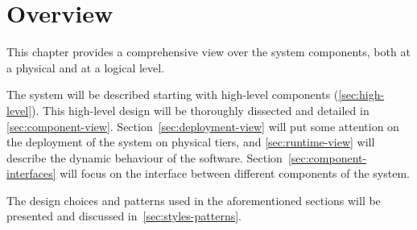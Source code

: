 \section{Overview}
\label{sec:overview}

This chapter provides a comprehensive view over the system components, both at a physical and at a logical level.

The system will be described starting with high-level components (\autoref{sec:high-level}). This high-level design will be thoroughly dissected and detailed in \autoref{sec:component-view}.
Section~\ref{sec:deployment-view} will put some attention on the deployment of the system on physical tiers, and \autoref{sec:runtime-view} will describe the dynamic behaviour of the software.
Section~\ref{sec:component-interfaces} will focus on the interface between different components of the system.

The design choices and patterns used in the aforementioned sections will be presented and discussed in~\autoref{sec:styles-patterns}.
